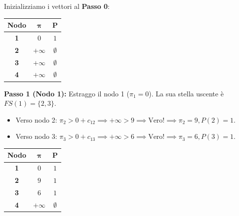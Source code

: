 \documentclass[12pt, a4paper]{article}
\begin{document}
	Inizializziamo i vettori al \textbf{Passo 0}:
	\begin{table}[H]
		\centering
		\begin{tabular}{|c|c|c|}
			\hline
			\textbf{Nodo} & $\boldsymbol{\pi}$ & $\mathbf{P}$ \\
			\hline
			\textbf{1} & $0$ & $1$ \\
			\textbf{2} & $+\infty$ & $\emptyset$ \\
			\textbf{3} & $+\infty$ & $\emptyset$ \\
			\textbf{4} & $+\infty$ & $\emptyset$ \\
			\hline
		\end{tabular}
	\end{table}
	
	\textbf{Passo 1 (Nodo 1):} 
	Estraggo il nodo 1 ($\pi_1 = 0$). La sua stella uscente è $FS(1) = \{2, 3\}$.
	\begin{itemize}
		\item Verso nodo 2: $\pi_2 > 0 + c_{12} \implies +\infty > 9 \implies \text{Vero!} \implies \pi_2=9, P(2)=1$.
		\item Verso nodo 3: $\pi_3 > 0 + c_{13} \implies +\infty > 6 \implies \text{Vero!} \implies \pi_3=6, P(3)=1$.
	\end{itemize}
	\begin{table}[H]
		\centering
		\begin{tabular}{|c|c|c|}
			\hline
			\textbf{Nodo} & $\boldsymbol{\pi}$ & $\mathbf{P}$ \\
			\hline
			\rowcolor{titlecolor!20} \textbf{1} & $0$ & $1$ \\
			\textbf{2} & $9$ & $1$ \\
			\textbf{3} & $6$ & $1$ \\
			\textbf{4} & $+\infty$ & $\emptyset$ \\
			\hline
		\end{tabular}
	\end{table}
	
\end{document}
